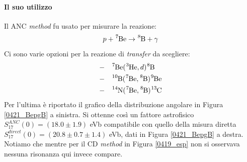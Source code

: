\paragraph{Il suo utilizzo} Il ANC \textit{method} fu usato per misurare la reazione:
$$p+\ce{^7Be}\to \ce{^8B}+\gamma$$
Ci sono varie opzioni per la reazione di \textit{transfer} da scegliere:
\begin{align*}
	-&\quad \ce{^7Be}(\ce{^3He},d)\ce{^8B} \\
	-&\quad \ce{^{10}B}(\ce{^7Be},\ce{^8B})\ce{^9Be} \\
	-&\quad \ce{^{14}N}(\ce{^7Be},\ce{^8B})\ce{^{13}C} 
\end{align*}
Per l'ultima è riportato il grafico della distribuzione angolare in Figura \ref{0421_BepgB} a sinistra. Si ottenne così un fattore astrofisico $S_{17}^{ANC}(0) = (18.0\pm 1.9)$ eVb compatibile con quello della misura diretta $S_{17}^{direct}(0) = (20.8\pm 0.7\pm 1.4)$ eVb, dati in Figura \ref{0421_BepgB} a destra. Notiamo che mentre per il CD \textit{method} in Figura \ref{0419_esp} non si osservava nessuna risonanza qui invece compare.


